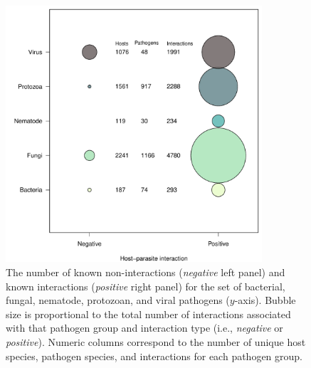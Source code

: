\documentclass[12pt]{article}
\begin{document}
\begin{figure}[h!]
  \begin{center}
    \includegraphics[width=0.85\textwidth]{Figures/bubble.pdf}
    \caption{The number of known non-interactions (\textit{negative} left panel) and known interactions (\textit{positive} right panel) for the set of bacterial, fungal, nematode, protozoan, and viral pathogens ($y$-axis). Bubble size is proportional to the total number of interactions associated with that pathogen group and interaction type (i.e., \textit{negative} or \textit{positive}). Numeric columns correspond to the number of unique host species, pathogen species, and interactions for each pathogen group. }
    \label{fig:bubble}
  \end{center}
\end{figure}




\clearpage
\end{document}
